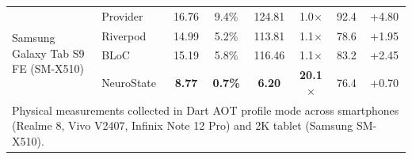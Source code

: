 \begin{table}[t]
{\begin{tabular}{llcccccc}
\midrule
\multirow{4}{*}{Samsung Galaxy Tab S9 FE (SM-X510)} & Provider       &        16.76 &    9.4\% &       124.81 &  1.0$\times$ &         92.4 &      +4.80 \\
                                 & Riverpod       &        14.99 &    5.2\% &       113.81 &  1.1$\times$ &         78.6 &      +1.95 \\
                                 & BLoC           &        15.19 &    5.8\% &       116.46 &  1.1$\times$ &         83.2 &      +2.45 \\
                                 & NeuroState     & \textbf{8.77} & \textbf{0.7\%} & \textbf{6.20} & \textbf{20.1$\times$} &         76.4 &      +0.70 \\

\bottomrule
\multicolumn{8}{l}{\footnotesize Physical measurements collected in Dart AOT profile mode across smartphones (Realme 8, Vivo V2407, Infinix Note 12 Pro) and 2K tablet (Samsung SM-X510).} \\
\end{tabular}
}
\end{table}
